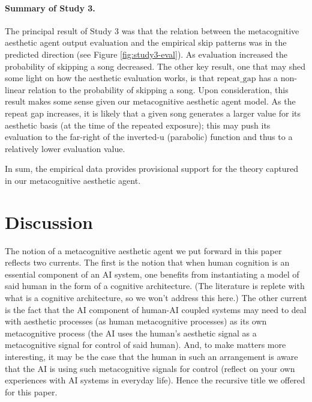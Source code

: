 \documentclass[letterpaper]{article} %
\begin{document}
\paragraph{Summary of Study 3.}
The principal result of Study 3 was that the relation between the metacognitive aesthetic agent output $\mathrm{evaluation}$ and the empirical skip patterns was in the predicted direction (see Figure \ref{fig:study3-eval}).  As $\mathrm{evaluation}$ increased the probability of skipping a song decreased.  The other key result, one that may shed some light on how the aesthetic evaluation works, is that $\mathrm{repeat\_gap}$ has a non-linear relation to the probability of skipping a song.  Upon consideration, this result makes some sense given our metacognitive aesthetic agent model.  As the repeat gap increases, it is likely that a given song generates a larger value for its aesthetic basis (at the time of the repeated exposure); this may push its evaluation to the far-right of the inverted-u (parabolic) function and thus to a relatively lower evaluation value. 

In sum, the empirical data provides provisional support for the theory captured in our metacognitive aesthetic agent.

\section{Discussion}
The notion of a metacognitive aesthetic agent we put forward in this paper reflects two currents.  The first is the notion that when human cognition is an essential component of an AI system, one benefits from instantiating a model of said human in the form of a cognitive architecture.  (The literature is replete with what is a cognitive architecture, so we won't address this here.)  The other current is the fact that the AI component of human-AI coupled systems may need to deal with aesthetic processes (as human metacognitive processes) as its own metacognitive process (the AI uses the human's aesthetic signal as a metacognitive signal for control of said human).  And, to make matters more interesting, it may be the case that the human in such an arrangement is aware that the AI is using such metacognitive signals for control (reflect on your own experiences with AI systems in everyday life).  Hence the recursive title we offered for this paper.  
\end{document}
